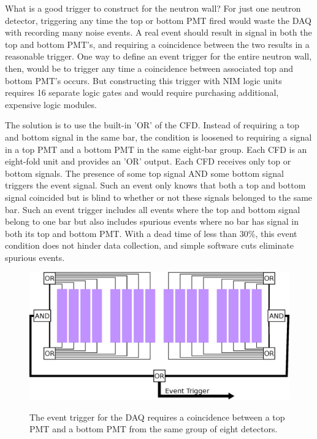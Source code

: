 What is a good trigger to construct for the neutron wall?  For just one neutron detector, triggering any time the top or bottom PMT fired would waste the DAQ with recording many noise events.  A real event should result in signal in both the top and bottom PMT's, and requiring a coincidence between the two results in a reasonable trigger.  One way to define an event trigger for the entire neutron wall, then, would be to trigger any time a coincidence between associated top and bottom PMT's occurs.  But constructing this trigger with NIM logic units requires 16 separate logic gates and would require purchasing additional, expensive logic modules.  

The solution is to use the built-in 'OR' of the CFD.  Instead of requiring a top and bottom signal in the same bar, the condition is loosened to requiring a signal in a top PMT and a bottom PMT in the same eight-bar group.  Each CFD is an eight-fold unit and provides an 'OR' output.  Each CFD receives only top or bottom signals.  The presence of some top signal AND some bottom signal triggers the event signal.  Such an event only knows that both a top and bottom signal coincided but is blind to whether or not these signals belonged to the same bar.  Such an event trigger includes all events where the top and bottom signal belong to one bar but also includes spurious events where no bar has signal in both its top and bottom PMT.  With a dead time of less than 30\%, this event condition does not hinder data collection, and simple software cuts eliminate spurious events.

\begin{figure}[ht]
\centering
\includegraphics[width=1.0\textwidth]{figures/event_trigger.eps}
\label{fig:eventTrig}
\caption{The event trigger for the DAQ requires a coincidence between a top PMT and a bottom PMT from the same group of eight detectors.}
\end{figure}



